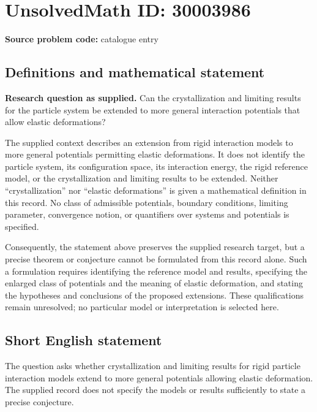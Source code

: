 \documentclass[11pt]{article}
\begin{document}
\section*{UnsolvedMath ID: 30003986}
\textbf{Source problem code:} catalogue entry
\subsection{Definitions and mathematical statement}
\textbf{Research question as supplied.} Can the crystallization and limiting results for the particle system be extended to more general interaction potentials that allow elastic deformations?

The supplied context describes an extension from rigid interaction models to more general potentials permitting elastic deformations. It does not identify the particle system, its configuration space, its interaction energy, the rigid reference model, or the crystallization and limiting results to be extended. Neither ``crystallization'' nor ``elastic deformations'' is given a mathematical definition in this record. No class of admissible potentials, boundary conditions, limiting parameter, convergence notion, or quantifiers over systems and potentials is specified.

Consequently, the statement above preserves the supplied research target, but a precise theorem or conjecture cannot be formulated from this record alone. Such a formulation requires identifying the reference model and results, specifying the enlarged class of potentials and the meaning of elastic deformation, and stating the hypotheses and conclusions of the proposed extensions. These qualifications remain unresolved; no particular model or interpretation is selected here.
\subsection{Short English statement}
The question asks whether crystallization and limiting results for rigid particle interaction models extend to more general potentials allowing elastic deformation. The supplied record does not specify the models or results sufficiently to state a precise conjecture.
\end{document}
